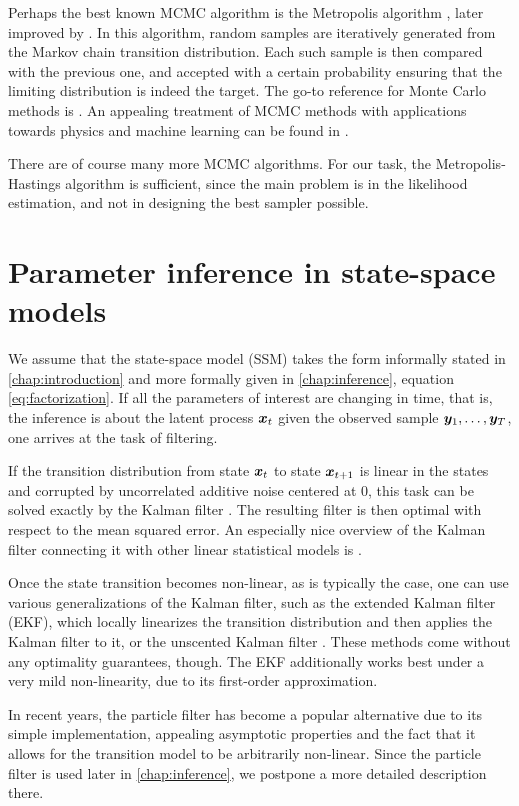 Perhaps the best known MCMC algorithm is the Metropolis algorithm \citep{metropolis}, later improved by \cite{hastings}. In this algorithm, random samples are iteratively generated from the Markov chain transition distribution. Each such sample is then compared with the previous one, and accepted with a certain probability ensuring that the limiting distribution is indeed the target. The go-to reference for Monte Carlo methods is \cite{robert-casella}. An appealing treatment of MCMC methods with applications towards physics and machine learning can be found in \cite{information-theory}.

There are of course many more MCMC algorithms. For our task, the Metropolis-Hastings algorithm is sufficient, since the main problem is in the likelihood estimation, and not in designing the best sampler possible.

\section{Parameter inference in state-space models}
We assume that the state-space model (SSM) takes the form informally stated in \autoref{chap:introduction} and more formally given in \autoref{chap:inference}, equation \eqref{eq:factorization}. If all the parameters of interest are changing in time, that is, the inference is about the latent process $\bm{x}_t$ given the observed sample $\bm{y}_1, \ldots, \bm{y}_T$, one arrives at the task of filtering.

If the transition distribution from state $\bm{x}_t$ to state $\bm{x}_{t+1}$ is linear in the states and corrupted by uncorrelated additive noise centered at 0, this task can be solved exactly by the Kalman filter \citep{kalman}. The resulting filter is then optimal with respect to the mean squared error. An especially nice overview of the Kalman filter connecting it with other linear statistical models is \cite{lds}.

Once the state transition becomes non-linear, as is typically the case, one can use various generalizations of the Kalman filter, such as the extended Kalman filter (EKF), which locally linearizes the transition distribution and then applies the Kalman filter to it, or the unscented Kalman filter \citep{ukf}. These methods come without any optimality guarantees, though. The EKF additionally works best under a very mild non-linearity, due to its first-order approximation.

In recent years, the particle filter \citep{particle-filter} has become a popular alternative due to its simple implementation, appealing asymptotic properties and the fact that it allows for the transition model to be arbitrarily non-linear. Since the particle filter is used later in \autoref{chap:inference}, we postpone a more detailed description there.

